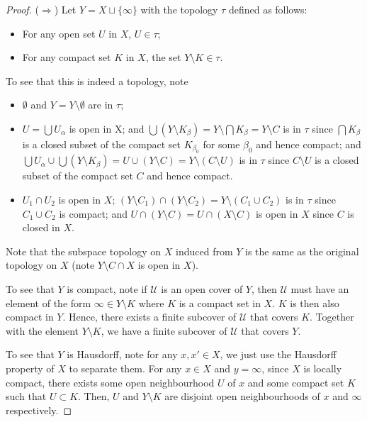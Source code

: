 \begin{proof}
    (\(\Rightarrow\)) Let $Y=X\sqcup \{\infty\}$ with the topology $\tau$ defined as follows:
    \begin{itemize}
        \item For any open set $U$ in $X$, $U\in \tau$;
        \item For any compact set $K$ in $X$, the set $Y\setminus K\in \tau$. 
    \end{itemize}

    To see that this is indeed a topology, note
    \begin{itemize}
        \item $\emptyset$ and $Y=Y\setminus \emptyset$ are in $\tau$;
        \item $U=\bigcup U_\alpha$ is open in X; and $\bigcup (Y\setminus K_\beta)=Y\setminus \bigcap K_\beta=Y\setminus C$ is in $\tau$ since $\bigcap K_\beta$ is a closed subset of the compact set $K_{\beta_0}$ for some $\beta_0$ and hence compact; and $\bigcup U_\alpha \cup \bigcup (Y\setminus K_\beta)=U\cup (Y\setminus C)=Y\setminus (C\setminus U)$ is in $\tau$ since $C\setminus U$ is a closed subset of the compact set $C$ and hence compact.
        \item $U_1\cap U_2$ is open in $X$; $(Y\setminus C_1)\cap (Y\setminus C_2)=Y\setminus (C_1\cup C_2)$ is in $\tau$ since $C_1\cup C_2$ is compact; and $U\cap (Y\setminus C)=U\cap (X\setminus C)$ is open in $X$ since $C$ is closed in $X$.
    \end{itemize}

    Note that the subspace topology on $X$ induced from $Y$ is the same as the original topology on $X$ (note $Y\setminus C\cap X$ is open in $X$). 

    To see that $Y$ is compact, note if $\mathcal{U}$ is an open cover of $Y$, then $\mathcal{U}$ must have an element of the form $\infty\in Y\setminus K$ where $K$ is a compact set in $X$. $K$ is then also compact in $Y$. Hence, there exists a finite subcover of $\mathcal{U}$ that covers $K$. Together with the element $Y\setminus K$, we have a finite subcover of $\mathcal{U}$ that covers $Y$.

    To see that $Y$ is Hausdorff, note for any $x,x'\in X$, we just use the Hausdorff property of $X$ to separate them. For any $x\in X$ and $y=\infty$, since $X$ is locally compact, there exists some open neighbourhood $U$ of $x$ and some compact set $K$ such that $U\subset K$. Then, $U$ and $Y\setminus K$ are disjoint open neighbourhoods of $x$ and $\infty$ respectively.


\end{proof}
